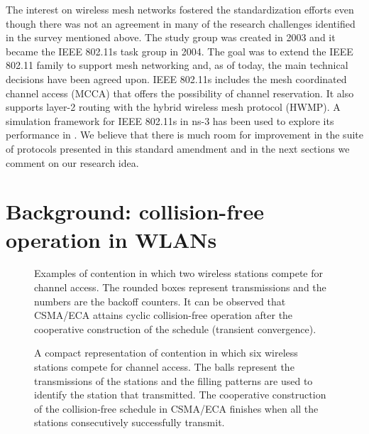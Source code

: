 \documentclass[a4paper,twocolumns]{article}%
\begin{document}
The interest on wireless mesh networks fostered the standardization efforts even though there was not an agreement in many of the research challenges identified in the survey mentioned above.
The study group was created in 2003 and it became the IEEE 802.11s task group in 2004.
The goal was to extend the IEEE 802.11 family to support mesh networking and, as of today, the main technical decisions have been agreed upon.
IEEE 802.11s includes the mesh coordinated channel access (MCCA) that offers the possibility of channel reservation.
It also supports layer-2 routing with the hybrid wireless mesh protocol (HWMP).
A simulation framework for IEEE 802.11s in ns-3 has been used to explore its performance in \cite{andreev2010ssv}.
We believe that there is much room for improvement in the suite of protocols presented in this standard amendment and in the next sections we comment on our research idea.


\section{Background: collision-free operation in WLANs}
\label{sec:background}


\begin{figure*}[!t]
\centering
{}
\caption{Examples of contention in which two wireless stations compete for channel access. The rounded boxes represent transmissions and the numbers are the backoff counters. It can be observed that CSMA/ECA attains cyclic collision-free operation after the cooperative construction of the schedule (transient convergence).}
\label{fig:ca_vs_eca}
\end{figure*}

\begin{figure*}[!t]
\centering
{}
\caption{A compact representation of contention in which six wireless stations compete for channel access. The balls represent the transmissions of the stations and the filling patterns are used to identify the station that transmitted. The cooperative construction of the collision-free schedule in CSMA/ECA finishes when all the stations consecutively successfully transmit.}
\label{fig:ca_vs_eca_compact}
\end{figure*}
\end{document}
